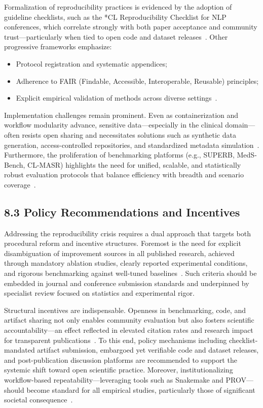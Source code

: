 \documentclass[11pt]{article}
\begin{document}
Formalization of reproducibility practices is evidenced by the adoption of guideline checklists, such as the *CL Reproducibility Checklist for NLP conferences, which correlate strongly with both paper acceptance and community trust—particularly when tied to open code and dataset releases~\cite{ref108}. Other progressive frameworks emphasize:

\begin{itemize}
  \item Protocol registration and systematic appendices;
  \item Adherence to FAIR (Findable, Accessible, Interoperable, Reusable) principles;
  \item Explicit empirical validation of methods across diverse settings~\cite{ref66,ref67,ref82}.
\end{itemize}

Implementation challenges remain prominent. Even as containerization and workflow modularity advance, sensitive data—especially in the clinical domain—often resists open sharing and necessitates solutions such as synthetic data generation, access-controlled repositories, and standardized metadata simulation~\cite{ref108}. Furthermore, the proliferation of benchmarking platforms (e.g., SUPERB, MedS-Bench, CL-MASR) highlights the need for unified, scalable, and statistically robust evaluation protocols that balance efficiency with breadth and scenario coverage~\cite{ref94,ref95,ref106}.

\subsection{8.3 Policy Recommendations and Incentives}

Addressing the reproducibility crisis requires a dual approach that targets both procedural reform and incentive structures. Foremost is the need for explicit disambiguation of improvement sources in all published research, achieved through mandatory ablation studies, clearly reported experimental conditions, and rigorous benchmarking against well-tuned baselines~\cite{ref107,ref108}. Such criteria should be embedded in journal and conference submission standards and underpinned by specialist review focused on statistics and experimental rigor.

Structural incentives are indispensable. Openness in benchmarking, code, and artifact sharing not only enables community evaluation but also fosters scientific accountability—an effect reflected in elevated citation rates and research impact for transparent publications~\cite{ref94,ref95,ref106,ref108}. To this end, policy mechanisms including checklist-mandated artifact submission, embargoed yet verifiable code and dataset releases, and post-publication discussion platforms are recommended to support the systemic shift toward open scientific practice. Moreover, institutionalizing workflow-based repeatability—leveraging tools such as Snakemake and PROV—should become standard for all empirical studies, particularly those of significant societal consequence~\cite{ref12,ref13,ref24,ref25,ref28,ref29,ref32,ref33,ref34,ref39,ref44,ref46,ref50,ref58,ref65,ref66,ref67,ref71,ref81,ref82,ref87,ref92,ref93,ref94,ref95,ref101,ref102,ref104,ref105,ref106,ref107,ref108}.
\end{document}
